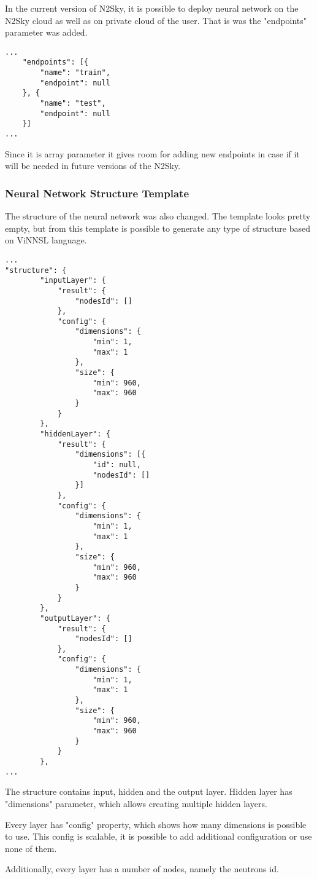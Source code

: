 In the current version of N2Sky, it is possible to deploy neural network on the N2Sky cloud as well as on private cloud of the user. That is was the "endpoints" parameter was added.

\begin{lstlisting}[caption=ViNNSL template enviroment]
...
    "endpoints": [{
        "name": "train",
        "endpoint": null
    }, {
        "name": "test",
        "endpoint": null
    }]
...
\end{lstlisting}

Since it is array parameter it gives room for adding new endpoints in case if it will be needed in future versions of the N2Sky.

\subsubsection{Neural Network Structure Template}\label{Neural Network Structure Template}

The structure of the neural network was also changed. The template looks pretty empty, but from this template is possible to generate any type of structure based on ViNNSL language. 

\begin{lstlisting}[caption=ViNNSL template structure]
...
"structure": {
		"inputLayer": {
			"result": {
				"nodesId": []
			},
			"config": {
				"dimensions": {
					"min": 1,
					"max": 1
				},
				"size": {
					"min": 960,
					"max": 960
				}
			}
		},
		"hiddenLayer": {
			"result": {
				"dimensions": [{
					"id": null,
					"nodesId": []
				}]
			},
			"config": {
				"dimensions": {
					"min": 1,
					"max": 1
				},
				"size": {
					"min": 960,
					"max": 960
				}
			}
		},
		"outputLayer": {
			"result": {
				"nodesId": []
			},
			"config": {
				"dimensions": {
					"min": 1,
					"max": 1
				},
				"size": {
					"min": 960,
					"max": 960
				}
			}
		},
...
\end{lstlisting}

The structure contains input, hidden and the output layer. Hidden layer has "dimensions" parameter, which allows creating multiple hidden layers.

 Every layer has "config" property, which shows how many dimensions is possible to use. This config is scalable, it is possible to add additional configuration or use none of them.
 
 Additionally, every layer has a number of nodes, namely the neutrons id.  
 
